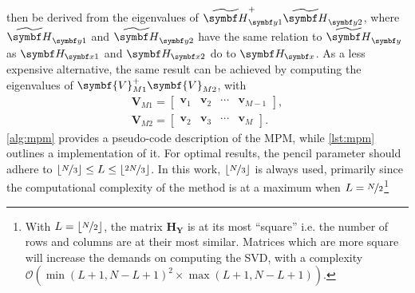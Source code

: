 then be derived from the eigenvalues of $\Hytildeone^+
\Hytildetwo^{\vphantom{+}}$, where $\Hytildeone$ and $\Hytildetwo$ have the
same relation to $\Hytilde$ as  $\Hxone$ and  $\Hxtwo$ do to  $\Hx$. As a
less expensive alternative, the same result can be achieved by
computing the eigenvalues of $\symbf{V}_{M1}^+\symbf{V}_{M2}^{\vphantom{+}}$,
with
\begin{subequations}
    \begin{gather}
        \symbf{V}_{M1} =
        \begin{bmatrix}
            \symbf{v}_1 & \symbf{v}_2 & \cdots & \symbf{v}_{M-1}
        \end{bmatrix},\\
        \symbf{V}_{M2} =
        \begin{bmatrix}
            \symbf{v}_2 & \symbf{v}_3 & \cdots & \symbf{v}_{M}
        \end{bmatrix}.
    \end{gather}
\end{subequations}
\cref{alg:mpm} provides a pseudo-code description of the \ac{MPM}, while
\cref{lst:mpm} outlines a \Python implementation of it. For optimal
results, the pencil parameter should adhere to $\lfloor \nicefrac{N}{3} \rfloor
\leq L \leq \lfloor\nicefrac{2N}{3}\rfloor$\cite{Hua1990}. In this work,
$\lfloor\nicefrac{N}{3}\rfloor$ is always used, primarily since the computational
complexity of the method is at a maximum when $L = \nicefrac{N}{2}$\footnote{
    With $L = \lfloor\nicefrac{N}{2}\rfloor$, the matrix
    $\symbf{H}_{\symbf{Y}}$ is at its most ``square'' i.e. the number of rows
    and columns are at their most similar. Matrices which are more
    square will increase the demands on computing the \ac{SVD}, with a
    complexity $\mathcal{O}(\min(L+1,N-L+1)^2 \times \max(L+1,N-L+1))$.
}


